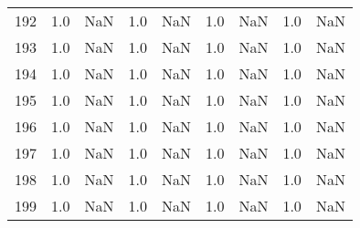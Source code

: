 \begin{tabular}{lrrrrrrrr}
192 & 1.0 & NaN & 1.0 & NaN & 1.0 & NaN & 1.0 & NaN \\
193 & 1.0 & NaN & 1.0 & NaN & 1.0 & NaN & 1.0 & NaN \\
194 & 1.0 & NaN & 1.0 & NaN & 1.0 & NaN & 1.0 & NaN \\
195 & 1.0 & NaN & 1.0 & NaN & 1.0 & NaN & 1.0 & NaN \\
196 & 1.0 & NaN & 1.0 & NaN & 1.0 & NaN & 1.0 & NaN \\
197 & 1.0 & NaN & 1.0 & NaN & 1.0 & NaN & 1.0 & NaN \\
198 & 1.0 & NaN & 1.0 & NaN & 1.0 & NaN & 1.0 & NaN \\
199 & 1.0 & NaN & 1.0 & NaN & 1.0 & NaN & 1.0 & NaN \\
\bottomrule
\end{tabular}
